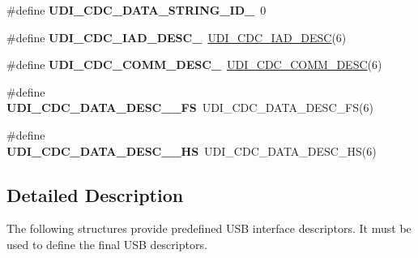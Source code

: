 \begin{DoxyCompactItemize}
\item 
\hypertarget{group__udi__cdc__group__desc_ga0a4411e0686f25af0dfef6092da362f6}{\#define {\bfseries U\-D\-I\-\_\-\-C\-D\-C\-\_\-\-D\-A\-T\-A\-\_\-\-S\-T\-R\-I\-N\-G\-\_\-\-I\-D\-\_}~0}\label{group__udi__cdc__group__desc_ga0a4411e0686f25af0dfef6092da362f6}

\item 
\hypertarget{group__udi__cdc__group__desc_ga94eafa354dc1df7560b58144a494850f}{\#define {\bfseries U\-D\-I\-\_\-\-C\-D\-C\-\_\-\-I\-A\-D\-\_\-\-D\-E\-S\-C\-\_}~\hyperlink{group__udi__cdc__group__desc_ga39928ecb0423aff5f7ab70ae98eb2c94}{U\-D\-I\-\_\-\-C\-D\-C\-\_\-\-I\-A\-D\-\_\-\-D\-E\-S\-C}(6)}\label{group__udi__cdc__group__desc_ga94eafa354dc1df7560b58144a494850f}

\item 
\hypertarget{group__udi__cdc__group__desc_ga7e79ac47aea90132630f70d3d0638674}{\#define {\bfseries U\-D\-I\-\_\-\-C\-D\-C\-\_\-\-C\-O\-M\-M\-\_\-\-D\-E\-S\-C\-\_}~\hyperlink{group__udi__cdc__group__desc_gac76fc1207bccd36e9851945206c063c0}{U\-D\-I\-\_\-\-C\-D\-C\-\_\-\-C\-O\-M\-M\-\_\-\-D\-E\-S\-C}(6)}\label{group__udi__cdc__group__desc_ga7e79ac47aea90132630f70d3d0638674}

\item 
\hypertarget{group__udi__cdc__group__desc_ga256259799c55488f0256e3d428bf2afd}{\#define {\bfseries U\-D\-I\-\_\-\-C\-D\-C\-\_\-\-D\-A\-T\-A\-\_\-\-D\-E\-S\-C\-\_\-\_\-\-F\-S}~U\-D\-I\-\_\-\-C\-D\-C\-\_\-\-D\-A\-T\-A\-\_\-\-D\-E\-S\-C\-\_\-\-F\-S(6)}\label{group__udi__cdc__group__desc_ga256259799c55488f0256e3d428bf2afd}

\item 
\hypertarget{group__udi__cdc__group__desc_ga396efe6efc1f62cfdbb91d9c0d76f23a}{\#define {\bfseries U\-D\-I\-\_\-\-C\-D\-C\-\_\-\-D\-A\-T\-A\-\_\-\-D\-E\-S\-C\-\_\-\_\-\-H\-S}~U\-D\-I\-\_\-\-C\-D\-C\-\_\-\-D\-A\-T\-A\-\_\-\-D\-E\-S\-C\-\_\-\-H\-S(6)}\label{group__udi__cdc__group__desc_ga396efe6efc1f62cfdbb91d9c0d76f23a}

\end{DoxyCompactItemize}


\subsection{Detailed Description}
The following structures provide predefined U\-S\-B interface descriptors. It must be used to define the final U\-S\-B descriptors. 

